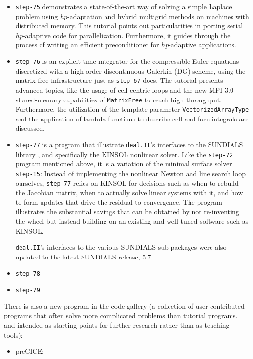 \documentclass{ansarticle-preprint}
\newcommand{\specialword}[1]{\texttt{#1}}
\newcommand{\dealii}{{\specialword{deal.II}}\xspace}
\begin{document}
\begin{itemize}
\item \texttt{step-75} demonstrates a state-of-the-art way of solving a simple
      Laplace problem using $hp$-adaptation and hybrid multigrid methods on machines
      with distributed memory. This tutorial points out particularities in porting
      serial $hp$-adaptive code for parallelization. Furthermore, it guides through
      the process of writing an efficient preconditioner for $hp$-adaptive applications.

\item \texttt{step-76} is an explicit time integrator for the
      compressible Euler equations discretized with a high-order discontinuous
      Galerkin (DG) scheme, using the matrix-free infrastructure just as \texttt{step-67} does.
      The tutorial presents advanced topics, like the usage of cell-centric loops and
      the new MPI-3.0 shared-memory capabilities of \texttt{MatrixFree} to reach high
      throughput. Furthermore, the utilization of the template parameter
      \texttt{VectorizedArrayType} and the application of lambda functions to describe cell and face
      integrals are discussed.

\item \texttt{step-77} is a program that illustrate \dealii{}'s
  interfaces to the SUNDIALS library \cite{sundials}, and specifically
  the KINSOL nonlinear solver. Like the \texttt{step-72} program
  mentioned above, it is a variation of the minimal surface solver
  \texttt{step-15}: Instead of implementing the nonlinear Newton and
  line search loop ourselves, \texttt{step-77} relies on KINSOL for
  decisions such as when to rebuild the Jacobian matrix, when to
  actually solve linear systems with it, and how to form updates that
  drive the residual to convergence. The program illustrates the
  substantial savings that can be obtained by not re-inventing the
  wheel but instead building on an existing and well-tuned software
  such as KINSOL.

  \dealii{}'s interfaces to the various SUNDIALS sub-packages were also updated to the latest SUNDIALS release, 5.7.

\item \texttt{step-78} 

\item \texttt{step-79} 
\end{itemize}

There is also a new program in the code gallery (a collection of
user-contributed programs that often solve more complicated problems
than tutorial programs, and intended as starting points for further
research rather than as teaching tools):
\begin{itemize}
  \item preCICE: 
\end{itemize}
\end{document}
